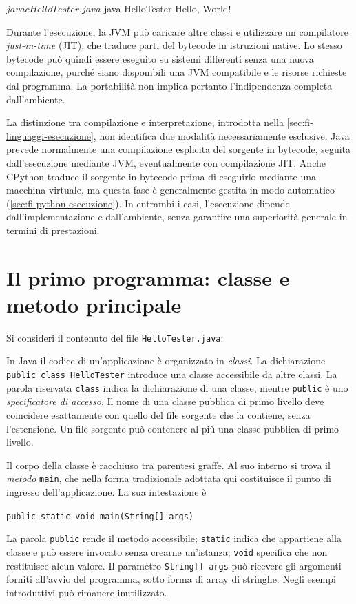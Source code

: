 \begin{unipdterminal}
$ javac HelloTester.java
$ java HelloTester
Hello, World!
\end{unipdterminal}

Durante l'esecuzione, la JVM può caricare altre classi e
utilizzare un compilatore \emph{just-in-time} (JIT), che traduce
parti del bytecode in istruzioni native. Lo stesso bytecode
può quindi essere eseguito su sistemi differenti senza una
nuova compilazione, purché siano disponibili una JVM compatibile
e le risorse richieste dal programma. La portabilità non
implica pertanto l'indipendenza completa dall'ambiente.

La distinzione tra compilazione e interpretazione, introdotta
nella \cref{sec:fi-linguaggi-esecuzione}, non identifica due
modalità necessariamente esclusive. Java prevede normalmente
una compilazione esplicita del sorgente in bytecode, seguita
dall'esecuzione mediante JVM, eventualmente con compilazione
JIT. Anche CPython traduce il sorgente in bytecode prima di
eseguirlo mediante una macchina virtuale, ma questa fase è
generalmente gestita in modo automatico
(\cref{sec:fi-python-esecuzione}). In entrambi i casi,
l'esecuzione dipende dall'implementazione e dall'ambiente,
senza garantire una superiorità generale in termini di
prestazioni.

\clearpage

\section{Il primo programma: classe e metodo principale}
\label{sec:fi-java-primo-programma}

Si consideri il contenuto del file \texttt{HelloTester.java}:



In Java il codice di un'applicazione è organizzato in \emph{classi}.
La dichiarazione \texttt{public class HelloTester} introduce una
classe accessibile da altre classi. La parola riservata \texttt{class}
indica la dichiarazione di una classe, mentre \texttt{public} è uno
\emph{specificatore di accesso}. Il nome di una classe pubblica
di primo livello deve coincidere esattamente con quello del file
sorgente che la contiene, senza l'estensione. Un file sorgente
può contenere al più una classe pubblica di primo livello.

Il corpo della classe è racchiuso tra parentesi graffe. Al suo
interno si trova il \emph{metodo} \texttt{main}, che nella forma
tradizionale adottata qui costituisce il punto di ingresso
dell'applicazione. La sua intestazione è
\begin{center}
  \texttt{public static void main(String[] args)}
\end{center}
La parola \texttt{public} rende il metodo accessibile;
\texttt{static} indica che appartiene alla classe e può essere
invocato senza crearne un'istanza; \texttt{void} specifica che
non restituisce alcun valore. Il parametro \texttt{String[] args}
può ricevere gli argomenti forniti all'avvio del programma,
sotto forma di array di stringhe. Negli esempi introduttivi
può rimanere inutilizzato.

